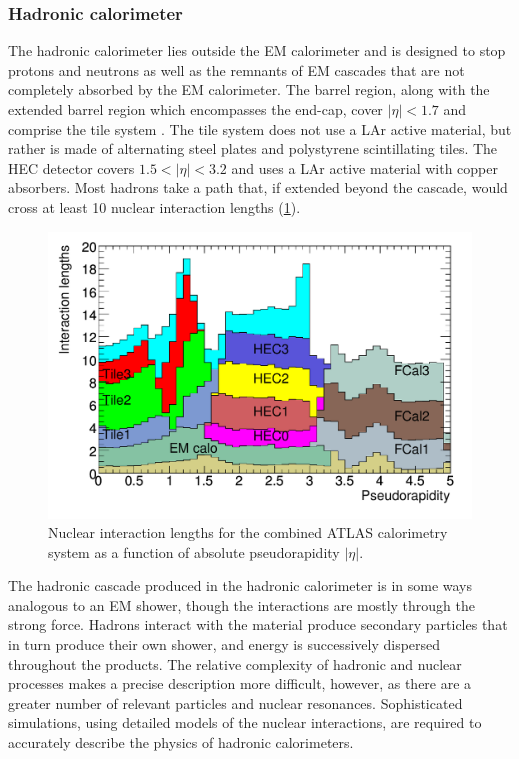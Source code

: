 
\subsubsection{Hadronic calorimeter}

The hadronic calorimeter lies outside the \ac{EM} calorimeter and is designed to stop protons and neutrons as well as the remnants of \ac{EM} cascades that are not completely absorbed by the \ac{EM} calorimeter.
The barrel region, along with the extended barrel region which encompasses the end-cap, cover $|\eta| < 1.7$ and comprise the tile system \cite{ATLAS:1996aa}.
The tile system does not use a \ac{LAr} active material, but rather is made of alternating steel plates and polystyrene scintillating tiles.
The \ac{HEC} detector covers $1.5 < |\eta| < 3.2$ and uses a \ac{LAr} active material with copper absorbers.
Most hadrons take a path that, if extended beyond the cascade, would cross at least 10 nuclear interaction lengths (\cref{fig:atlas_calo_nuclear_int_length}).

\begin{figure}[t]
\includegraphics{calo_nuclear_int_length.pdf}
\caption{Nuclear interaction lengths for the combined ATLAS calorimetry system as a function of absolute pseudorapidity $|\eta|$.}
\label{fig:atlas_calo_nuclear_int_length}
\end{figure}

The hadronic cascade produced in the hadronic calorimeter is in some ways analogous to an \ac{EM} shower, though the interactions are mostly through the strong force.
Hadrons interact with the material produce secondary particles that in turn produce their own shower, and energy is successively dispersed throughout the products.
The relative complexity of hadronic and nuclear processes makes a precise description more difficult, however, as there are a greater number of relevant particles and nuclear resonances.
Sophisticated \mc simulations, using detailed models of the nuclear interactions, are required to accurately describe the physics of hadronic calorimeters.

